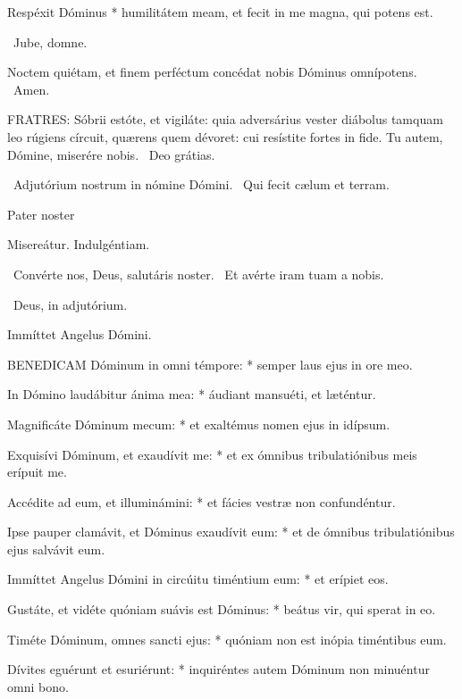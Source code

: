  Respéxit Dóminus * humilitátem meam, et fecit in me magna, qui potens est.



\V\ Jube, domne.

 Noctem quiétam, et finem perféctum concédat nobis Dóminus omnípotens. \R\ Amen.


\lettrine[lines=2]{F}{RATRES}: Sóbrii estóte, et vigiláte: quia adversárius vester diábolus tamquam leo rúgiens círcuit, quærens quem dévoret: cui resístite fortes in fide. Tu autem, Dómine, miserére nobis. \R\ Deo grátias.

\V\ Adjutórium nostrum in nómine Dómini. \R\ Qui fecit cælum et terram.

Pater noster 

 Misereátur. Indulgéntiam.

\V\ Convérte nos, Deus, salutáris noster. \R\ Et avérte iram tuam a nobis.

\V\ Deus, in adjutórium.

 Immíttet Angelus Dómini.


\lettrine[lines=2]{B}{ENEDICAM} Dóminum in omni témpore: * semper laus ejus in ore meo.

In Dómino laudábitur ánima mea: * áudiant mansuéti, et læténtur.

Magnificáte Dóminum mecum: * et exaltémus nomen ejus in idípsum.

Exquisívi Dóminum, et exaudívit me: * et ex ómnibus tribulatiónibus meis erípuit me.

Accédite ad eum, et illuminámini: * et fácies vestræ non confundéntur.

Ipse pauper clamávit, et Dóminus exaudívit eum: * et de ómnibus tribulatiónibus ejus salvávit eum.

Immíttet Angelus Dómini in circúitu timéntium eum: * et erípiet eos.

Gustáte, et vidéte quóniam suávis est Dóminus: * beátus vir, qui sperat in eo.

Timéte Dóminum, omnes sancti ejus: * quóniam non est inópia timéntibus eum.

Dívites eguérunt et esuriérunt: * inquiréntes autem Dóminum non minuéntur omni bono.

